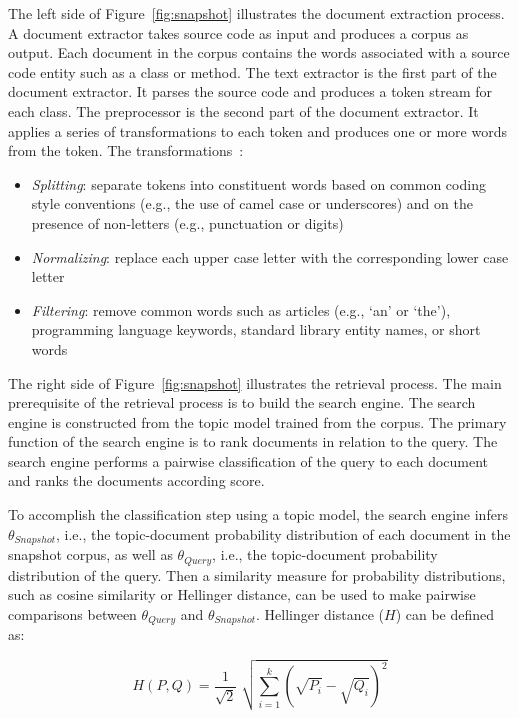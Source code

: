 The left side of Figure~\ref{fig:snapshot} illustrates the document extraction process.
A document extractor takes source code as input and produces a corpus as output.
Each document in the corpus contains the words associated with a source code entity
such as a class or method.
The text extractor is the first part of the document extractor.
It parses the source code and produces a token stream for each class.
The preprocessor is the second part of the document extractor.
It applies a series of transformations to each token and
produces one or more words from the token.
The transformations~\cite{Marcus-etal:2004,Marcus-Menzies:2010}: %
\begin{itemize}
    \item {\it Splitting}: separate tokens into constituent words
        based on common coding style conventions (e.g., the use of camel case or underscores)
        and on the presence of non-letters (e.g., punctuation or digits)
    \item {\it Normalizing}: replace each upper case letter with the corresponding lower case letter
    \item {\it Filtering}: remove common words such as articles (e.g., `an' or `the'),
        programming language keywords, standard library entity names, or short words
\end{itemize}

The right side of Figure~\ref{fig:snapshot} illustrates the retrieval process.
The main prerequisite of the retrieval process is to build the search engine.
The search engine is constructed from the topic model trained from the corpus.
The primary function of the search engine is to rank documents in relation to the query.
The search engine performs a pairwise classification of the query
to each document and ranks the documents according score.

To accomplish the classification step using a topic model,
the search engine infers $\theta_{Snapshot}$, i.e.,
the topic-document probability distribution of each document in the snapshot corpus,
as well as $\theta_{Query}$, i.e., the topic-document probability distribution  of the query.
Then a similarity measure for probability distributions, such as
cosine similarity or Hellinger distance, can be used to make pairwise comparisons
between $\theta_{Query}$ and $\theta_{Snapshot}$.
Hellinger distance ($H$) can be defined as:

\begin{equation}
    H(P, Q) = \frac{1}{\sqrt{2}} \; \sqrt{\sum_{i=1}^{k} (\sqrt{P_i} - \sqrt{Q_i})^2}
\end{equation}

